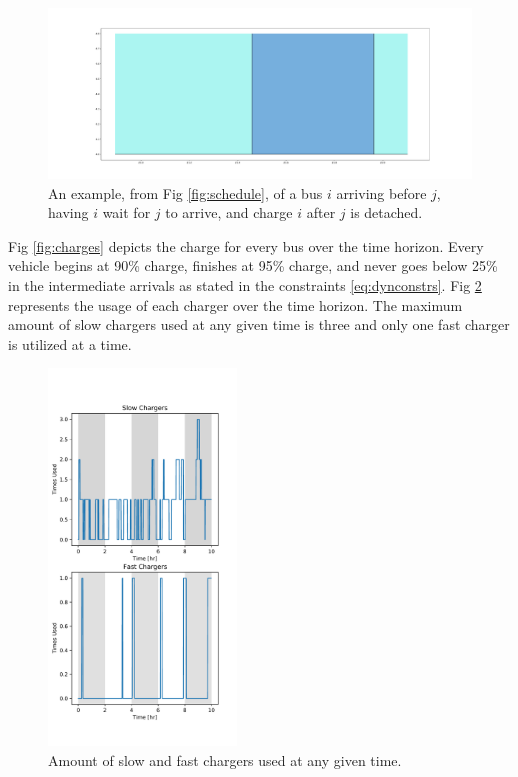 \documentclass[letterpaper, 10pt, conference]{IEEEtran}
\begin{document}
\begin{figure}[h]
	\centering
	\includegraphics[trim=0in 0in 0in 0in, width=\linewidth]{unoptimal.pdf}
	\caption{An example, from Fig \ref{fig:schedule}, of a bus $i$ arriving before $j$, having $i$ wait for $j$ to arrive, and charge $i$ after $j$ is detached.}
	\label{fig:unoptimal}
\end{figure}

Fig \ref{fig:charges} depicts the charge for every bus over the time horizon. Every vehicle begins at 90\% charge,
finishes at 95\% charge, and never goes below 25\% in the intermediate arrivals as stated in the constraints
\eqref{eq:dynconstrs}. Fig \ref{fig:usage} represents the usage of each charger over the time horizon. The maximum
amount of slow chargers used at any given time is three and only one fast charger is utilized at a time.

\begin{figure}[h!]
	\centering
	\includegraphics[trim=0in 0in 0in 0in, width=0.7\linewidth, height=10cm]{usage.pdf}
	\caption{Amount of slow and fast chargers used at any given time.}
	\label{fig:usage}
\end{figure}
\end{document}
